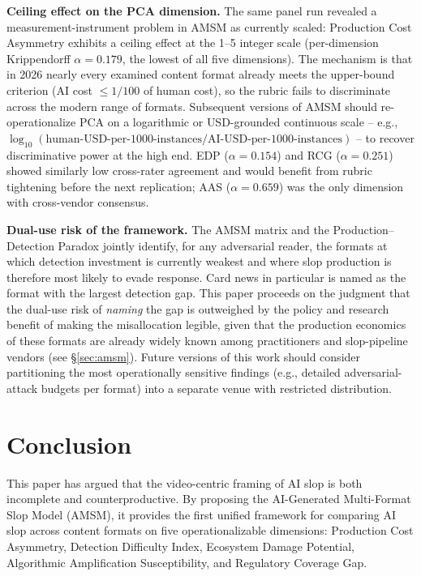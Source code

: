 \documentclass[12pt,a4paper]{article}
\begin{document}
\textbf{Ceiling effect on the PCA dimension.} The same panel run revealed a measurement-instrument problem in AMSM as currently scaled: Production Cost Asymmetry exhibits a ceiling effect at the 1--5 integer scale (per-dimension Krippendorff $\alpha = 0.179$, the lowest of all five dimensions). The mechanism is that in 2026 nearly every examined content format already meets the upper-bound criterion (AI cost $\le 1/100$ of human cost), so the rubric fails to discriminate across the modern range of formats. Subsequent versions of AMSM should re-operationalize PCA on a logarithmic or USD-grounded continuous scale -- e.g., $\log_{10}(\text{human-USD-per-1000-instances} / \text{AI-USD-per-1000-instances})$ -- to recover discriminative power at the high end. EDP ($\alpha = 0.154$) and RCG ($\alpha = 0.251$) showed similarly low cross-rater agreement and would benefit from rubric tightening before the next replication; AAS ($\alpha = 0.659$) was the only dimension with cross-vendor consensus.

\textbf{Dual-use risk of the framework.} The AMSM matrix and the Production--Detection Paradox jointly identify, for any adversarial reader, the formats at which detection investment is currently weakest and where slop production is therefore most likely to evade response. Card news in particular is named as the format with the largest detection gap. This paper proceeds on the judgment that the dual-use risk of \emph{naming} the gap is outweighed by the policy and research benefit of making the misallocation legible, given that the production economics of these formats are already widely known among practitioners and slop-pipeline vendors (see \S\ref{sec:amsm}). Future versions of this work should consider partitioning the most operationally sensitive findings (e.g., detailed adversarial-attack budgets per format) into a separate venue with restricted distribution.


\section{Conclusion}
\label{sec:conclusion}

This paper has argued that the video-centric framing of AI slop is both incomplete and counterproductive. By proposing the AI-Generated Multi-Format Slop Model (AMSM), it provides the first unified framework for comparing AI slop across content formats on five operationalizable dimensions: Production Cost Asymmetry, Detection Difficulty Index, Ecosystem Damage Potential, Algorithmic Amplification Susceptibility, and Regulatory Coverage Gap.
\end{document}

